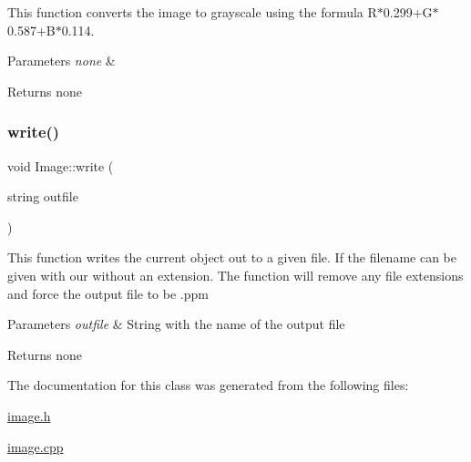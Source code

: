 This function converts the image to grayscale using the formula R$\ast$0.299+\+G$\ast$0.587+\+B$\ast$0.114.


\begin{DoxyParams}{Parameters}
{\em none} & \\
\hline
\end{DoxyParams}
\begin{DoxyReturn}{Returns}
none 
\end{DoxyReturn}
\mbox{\label{class_image_addd74434babf60a45c1d7b9fc155723a}} 
\subsubsection{\texorpdfstring{write()}{write()}}
{\footnotesize\ttfamily void Image\+::write (\begin{DoxyParamCaption}\item[{string}]{outfile }\end{DoxyParamCaption})}

This function writes the current object out to a given file. If the filename can be given with our without an extension. The function will remove any file extensions and force the output file to be .ppm


\begin{DoxyParams}{Parameters}
{\em outfile} & String with the name of the output file \\
\hline
\end{DoxyParams}
\begin{DoxyReturn}{Returns}
none 
\end{DoxyReturn}


The documentation for this class was generated from the following files\+:\begin{DoxyCompactItemize}
\item 
\hyperlink{image_8h}{image.\+h}\item 
\hyperlink{image_8cpp}{image.\+cpp}\end{DoxyCompactItemize}
